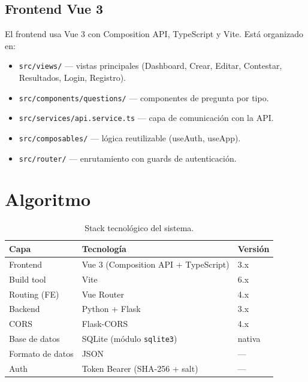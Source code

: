 \documentclass[12pt,a4paper]{article}
\begin{document}
\subsection{Frontend Vue 3}

El frontend usa Vue 3 con Composition API, TypeScript y Vite. Está organizado en:

\begin{itemize}
  \item \texttt{src/views/} — vistas principales (Dashboard, Crear, Editar, Contestar, Resultados, Login, Registro).
  \item \texttt{src/components/questions/} — componentes de pregunta por tipo.
  \item \texttt{src/services/api.service.ts} — capa de comunicación con la API.
  \item \texttt{src/composables/} — lógica reutilizable (useAuth, useApp).
  \item \texttt{src/router/} — enrutamiento con guards de autenticación.
\end{itemize}

\section{Algoritmo }

\begin{table}[H]
\centering
\renewcommand{\arraystretch}{1.3}
\begin{tabularx}{\textwidth}{lXl}
\toprule
\textbf{Capa} & \textbf{Tecnología} & \textbf{Versión} \\
\midrule
Frontend & Vue 3 (Composition API + TypeScript) & 3.x \\
Build tool & Vite & 6.x \\
Routing (FE) & Vue Router & 4.x \\
Backend & Python + Flask & 3.x \\
CORS & Flask-CORS & 4.x \\
Base de datos & SQLite (módulo \texttt{sqlite3}) & nativa \\
Formato de datos & JSON & --- \\
Auth & Token Bearer (SHA-256 + salt) & --- \\
\bottomrule
\end{tabularx}
\caption{Stack tecnológico del sistema.}
\end{table}
\end{document}
